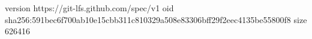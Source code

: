 version https://git-lfs.github.com/spec/v1
oid sha256:591bec6f700ab10e15cbb311c810329a508e83306bff29f2eec4135be55800f8
size 626416
